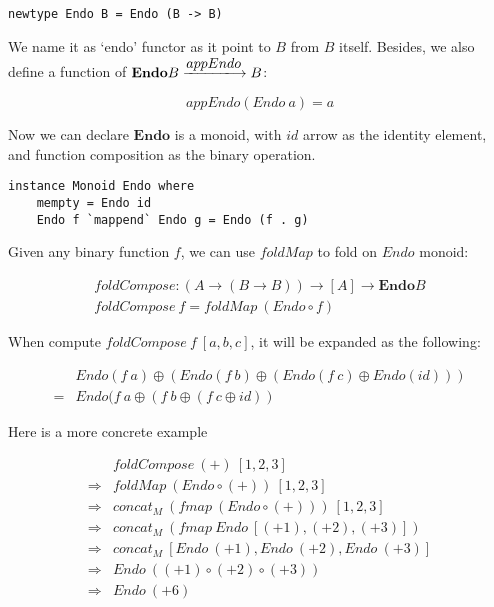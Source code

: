 \documentclass{article}
\begin{document}
\lstset{frame=none}
\begin{lstlisting}[style=Haskell]
newtype Endo B = Endo (B -> B)
\end{lstlisting}

We name it as `endo' functor as it point to $B$ from $B$ itself. Besides, we also define a function of $\mathbf{Endo}B \arrowto{appEndo} B$:

\[
appEndo(Endo\ a) = a
\]

Now we can declare $\mathbf{Endo}$ is a monoid, with $id$ arrow as the identity element, and function composition as the binary operation.

\lstset{frame=single}
\begin{lstlisting}[style=Haskell]
instance Monoid Endo where
    mempty = Endo id
    Endo f `mappend` Endo g = Endo (f . g)
\end{lstlisting}

Given any binary function $f$, we can use $foldMap$ to fold on $Endo$ monoid:

\[
\begin{array}{l}
foldCompose : (A \to (B \to B)) \to [A] \to \mathbf{Endo}B \\
foldCompose\ f = foldMap\ (Endo \circ f)
\end{array}
\]

When compute $foldCompose\ f\ [a, b, c]$, it will be expanded as the following:

\[
\begin{array}{cl}
  & Endo(f\ a) \oplus (Endo(f\ b) \oplus (Endo(f\ c) \oplus Endo(id))) \\
= & Endo(f\ a \oplus (f\ b \oplus (f\ c \oplus id))
\end{array}
\]

Here is a more concrete example

\[
\begin{array}{cl}
            & foldCompose\ (+)\ [1, 2, 3] \\
\Rightarrow & foldMap\ (Endo \circ (+))\ [1, 2, 3] \\
\Rightarrow & concat_M\ (fmap\ (Endo \circ (+)))\ [1, 2, 3] \\
\Rightarrow & concat_M\ (fmap\ Endo\ [(+1), (+2), (+3)]) \\
\Rightarrow & concat_M\ [Endo\ (+1), Endo\ (+2), Endo\ (+3)] \\
\Rightarrow & Endo\ ((+1) \circ (+2) \circ (+3)) \\
\Rightarrow & Endo\ (+6) \\
\end{array}
\]
\end{document}
